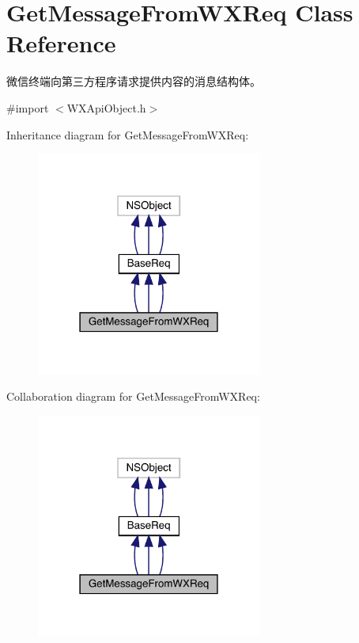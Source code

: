 \hypertarget{interface_get_message_from_w_x_req}{}\section{Get\+Message\+From\+W\+X\+Req Class Reference}
\label{interface_get_message_from_w_x_req}


微信终端向第三方程序请求提供内容的消息结构体。  




{\ttfamily \#import $<$W\+X\+Api\+Object.\+h$>$}



Inheritance diagram for Get\+Message\+From\+W\+X\+Req\+:\nopagebreak
\begin{figure}[H]
\begin{center}
\leavevmode
\includegraphics[width=210pt]{interface_get_message_from_w_x_req__inherit__graph}
\end{center}
\end{figure}


Collaboration diagram for Get\+Message\+From\+W\+X\+Req\+:\nopagebreak
\begin{figure}[H]
\begin{center}
\leavevmode
\includegraphics[width=210pt]{interface_get_message_from_w_x_req__coll__graph}
\end{center}
\end{figure}
